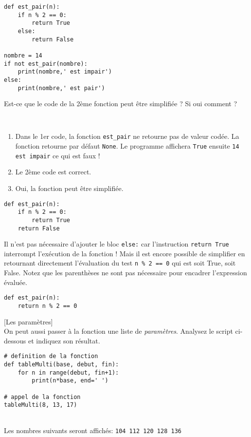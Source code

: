 \documentclass[a4paper,12pt]{article}
\begin{document}
\begin{lstlisting}  
def est_pair(n):
    if n % 2 == 0:
        return True
    else:
        return False

nombre = 14
if not est_pair(nombre):
    print(nombre,' est impair')
else:
    print(nombre,' est pair')
\end{lstlisting}
Est-ce que le code de la 2ème fonction peut être simplifiée ? Si oui comment ?
\begin{correction}
	~\\ \vspace{-5pt}
	\begin{enumerate}
        \item Dans le 1er code, la fonction \lstinline{est_pair} ne retourne pas de valeur codée. La fonction retourne par défaut \lstinline{None}. Le programme affichera \lstinline{True} ensuite \lstinline{14 est impair} ce qui est faux !
        \item Le 2ème code est correct.
        \item Oui, la fonction peut être simplifiée.
    \end{enumerate}
\begin{lstlisting}  
def est_pair(n):
    if n % 2 == 0:
        return True
    return False
\end{lstlisting}
Il n'est pas nécessaire d'ajouter le bloc \lstinline{else:} car l'instruction \lstinline{return True} interrompt l’exécution de la fonction ! Mais il est encore possible de simplifier en retournant directement l'évaluation du test \lstinline{n % 2 == 0} qui est soit True, soit False. Notez que les parenthèses ne sont pas nécessaire pour encadrer l'expression évaluée.
\begin{lstlisting}  
def est_pair(n):
    return n % 2 == 0
\end{lstlisting}

\end{correction}

\finexo

\exo{}[Les paramètres]  ~\\ 
On peut aussi passer à la fonction une liste de {\it paramètres}. Analysez le script ci-dessous et indiquez son résultat.
\begin{lstlisting}
# definition de la fonction    
def tableMulti(base, debut, fin):
    for n in range(debut, fin+1):
        print(n*base, end=' ')

# appel de la fonction
tableMulti(8, 13, 17)
\end{lstlisting}
\begin{correction}
	~\\ \vspace{-5pt}
    Les nombres suivants seront affichés:
    \lstinline{104 112 120 128 136}
\end{correction}
\finexo
\end{document}
